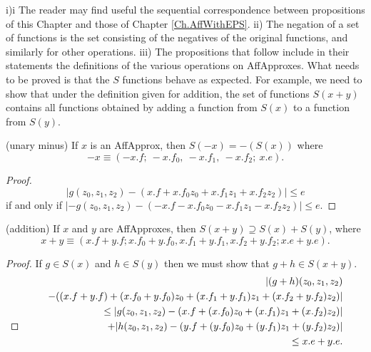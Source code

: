 \begin{remarks} \label{GMT 6.6}
i)i
The reader may find useful the sequential correspondence between propositions of this Chapter and those of
	Chapter \ref{Ch.AffWithEPS}.
ii)  The negation of a set of functions is the set consisting of the negatives of the original functions, and similarly for other operations.
iii)  The propositions that follow include in their statements the definitions of the various operations on AffApproxes.  What needs to
be proved is that the $S$ functions behave as expected.  For example, we need to show that under the definition given for addition, the
set of functions $S(x+y)$ contains all functions obtained by adding a function from $S(x)$ to a function from $S(y).$\end{remarks}

\begin{proposition}{\label{GMT prop6.1} {\textrm (unary minus)}} If $x$ is an {\textrm AffApprox,} then 
$S(-x) = -(S(x))$ where 
$$-x \equiv (-x.f;\ -x.f_0,\ -x.f_1,\ -x.f_2;\ x.e).$$ 
\end{proposition}

\begin{proof}
$$|g(z_0,z_1,z_2) - (x.f + x.f_0 z_0 + x.f_1 z_1 + x.f_2 z_2)| \le e$$
if and only if 
\hfill $|-g(z_0,z_1,z_2) - (-x.f - x.f_0 z_0 - x.f_1 z_1 - x.f_2 z_2)| \le e.$ \hfill\end{proof}


\begin{proposition}{\label{GMT prop6.2} {\textrm (addition)}} \hskip-8pt If $x$ and $y$ are {\textrm AffApproxes,} then $S(x + y) \supseteq S(x)
+ S(y)${\textrm ,} where
$$x + y \equiv (x.f + y.f; x.f_0 + y.f_0, x.f_1 + y.f_1, x.f_2 + y.f_2; x.e + y.e).$$
\end{proposition}  

\begin{proof}{}  If $g\in S(x)$ and $h \in S(y)$ then we must show that $g + h \in S(x + y).$
\begin{eqnarray*}
&&|(g + h)(z_0,z_1,z_2) \\
&&\quad- ((x.f + y.f) + (x.f_0 + y.f_0) z_0 + (x.f_1 + y.f_1) z_1 + (x.f_2 + y.f_2) z_2)| \\
&&\qquad 
\le |g(z_0,z_1,z_2) - 
(x.f + (x.f_0) z_0 + (x.f_1) z_1 + (x.f_2) z_2)| \\
&&\quad\qquad + 
|h(z_0,z_1,z_2) - (y.f + (y.f_0) z_0 + (y.f_1) z_1 + (y.f_2) z_2)| 
                                        \\
&&\qquad \le x.e + y.e.\\
\noalign{\vskip-36pt}
\end{eqnarray*}
\end{proof}

